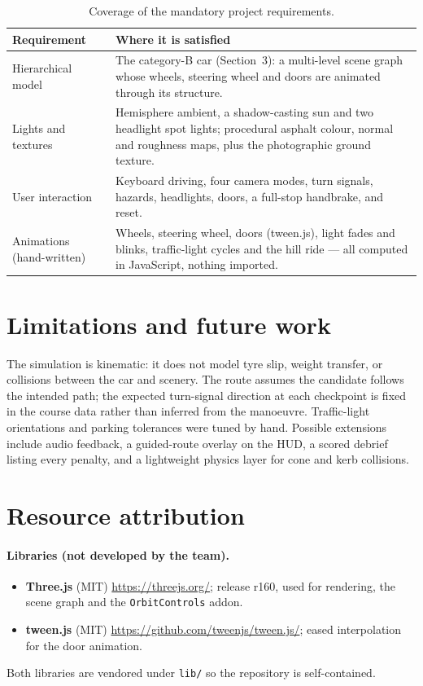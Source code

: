 \documentclass[11pt]{article}
\newcommand{\code}[1]{\texttt{#1}}
\begin{document}
\begin{table}[h]
  \centering
  \caption{Coverage of the mandatory project requirements.}
  \label{tab:coverage}
  \small
  \begin{tabular}{@{}lp{}@{}}
    \toprule
    Requirement & Where it is satisfied \\
    \midrule
    Hierarchical model & The category-B car (Section~3): a multi-level scene graph
      whose wheels, steering wheel and doors are animated through its structure. \\
    Lights and textures & Hemisphere ambient, a shadow-casting sun and two
      headlight spot lights; procedural asphalt colour, normal and roughness maps,
      plus the photographic ground texture. \\
    User interaction & Keyboard driving, four camera modes, turn signals, hazards,
      headlights, doors, a full-stop handbrake, and reset. \\
    Animations (hand-written) & Wheels, steering wheel, doors (tween.js), light
      fades and blinks, traffic-light cycles and the hill ride --- all computed in
      JavaScript, nothing imported. \\
    \bottomrule
  \end{tabular}
\end{table}

\section{Limitations and future work}

The simulation is kinematic: it does not model tyre slip, weight transfer, or
collisions between the car and scenery. The route assumes the candidate follows
the intended path; the expected turn-signal direction at each checkpoint is fixed
in the course data rather than inferred from the manoeuvre. Traffic-light
orientations and parking tolerances were tuned by hand. Possible extensions
include audio feedback, a guided-route overlay on the HUD, a scored debrief
listing every penalty, and a lightweight physics layer for cone and kerb
collisions.

\section{Resource attribution}

\paragraph{Libraries (not developed by the team).}
\begin{itemize}
  \item \textbf{Three.js} (MIT) \textemdash{} \url{https://threejs.org/}; release
    r160, used for rendering, the scene graph and the \code{OrbitControls} addon.
  \item \textbf{tween.js} (MIT) \textemdash{}
    \url{https://github.com/tweenjs/tween.js/}; eased interpolation for the door
    animation.
\end{itemize}
Both libraries are vendored under \code{lib/} so the repository is self-contained.
\end{document}
